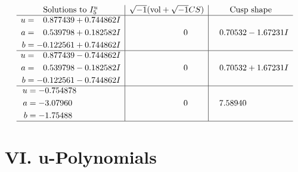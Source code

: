 \documentclass[1p]{elsarticle_modified}
\theoremstyle{definition}
\newcommand{\I}{\sqrt{-1}}
\begin{document}
$$\begin{array}{c|c|c}  
\text{Solutions to }I^u_{5}& \I (\text{vol} + \sqrt{-1}CS) & \text{Cusp shape}\\
 \hline 
\begin{aligned}
u &= \phantom{-}0.877439 + 0.744862 I \\
a &= \phantom{-}0.539798 + 0.182582 I \\
b &= -0.122561 + 0.744862 I\end{aligned}
 & \phantom{-0.000000 } 0 & \phantom{-}0.70532 - 1.67231 I \\ \hline\begin{aligned}
u &= \phantom{-}0.877439 - 0.744862 I \\
a &= \phantom{-}0.539798 - 0.182582 I \\
b &= -0.122561 - 0.744862 I\end{aligned}
 & \phantom{-0.000000 } 0 & \phantom{-}0.70532 + 1.67231 I \\ \hline\begin{aligned}
u &= -0.754878\phantom{ +0.000000I} \\
a &= -3.07960\phantom{ +0.000000I} \\
b &= -1.75488\phantom{ +0.000000I}\end{aligned}
 & \phantom{-0.000000 } 0 & \phantom{-}7.58940\phantom{ +0.000000I}\\
 \hline 
 \end{array}$$\newpage
\newpage\renewcommand{\arraystretch}{1}
\centering \section*{ VI. u-Polynomials}
\end{document}
